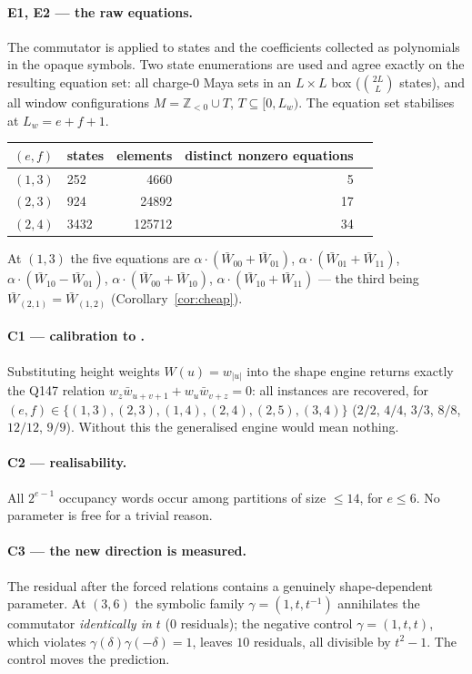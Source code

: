 \documentclass[11pt]{article}
\theoremstyle{definition}
\theoremstyle{remark}
\newcommand{\Z}{\mathbb{Z}}
\begin{document}
\paragraph{E1, E2 --- the raw equations.}
The commutator is applied to states and the coefficients collected as polynomials in the
opaque symbols.  Two state enumerations are used and agree exactly on the resulting
equation set: all charge-$0$ Maya sets in an $L\times L$ box
($\binom{2L}{L}$ states), and all window configurations $M=\Z_{<0}\cup T$,
$T\subseteq[0,L_w)$.  The equation set stabilises at $L_w=e+f+1$.
\begin{center}
\begin{tabular}{llrrr}
$(e,f)$ & states & elements & distinct nonzero equations\\\hline
$(1,3)$ & 252 & 4660 & 5\\
$(2,3)$ & 924 & 24892 & 17\\
$(2,4)$ & 3432 & 125712 & 34\\
\end{tabular}
\end{center}
At $(1,3)$ the five equations are $\alpha\cdot(\bar W_{00}+\bar W_{01})$,
$\alpha\cdot(\bar W_{01}+\bar W_{11})$, $\alpha\cdot(\bar W_{10}-\bar W_{01})$,
$\alpha\cdot(\bar W_{00}+\bar W_{10})$, $\alpha\cdot(\bar W_{10}+\bar W_{11})$ ---
the third being $\bar W_{(2,1)}=\bar W_{(1,2)}$ (Corollary~\ref{cor:cheap}).

\paragraph{C1 --- calibration to \cite{Q147}.}  Substituting height weights
$W(u)=w_{|u|}$ into the shape engine returns exactly the Q147 relation
$w_z\bar w_{u+v+1}+w_u\bar w_{v+z}=0$: all instances are recovered, for
$(e,f)\in\{(1,3),(2,3),(1,4),(2,4),(2,5),(3,4)\}$ ($2/2$, $4/4$, $3/3$, $8/8$, $12/12$,
$9/9$).  Without this the generalised engine would mean nothing.

\paragraph{C2 --- realisability.}  All $2^{e-1}$ occupancy words occur among partitions
of size $\le14$, for $e\le6$.  No parameter is free for a trivial reason.

\paragraph{C3 --- the new direction is measured.}  The residual after the forced
relations contains a genuinely shape-dependent parameter.  At $(3,6)$ the symbolic family
$\gamma=(1,t,t^{-1})$ annihilates the commutator \emph{identically in $t$}
($0$ residuals); the negative control $\gamma=(1,t,t)$, which violates
$\gamma(\delta)\gamma(-\delta)=1$, leaves $10$ residuals, all divisible by $t^2-1$.  The
control moves the prediction.
\end{document}
